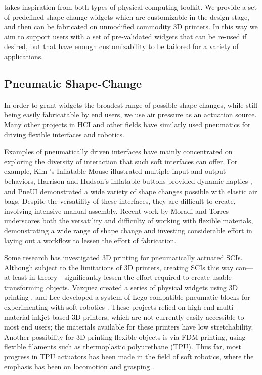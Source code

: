       \mp takes inspiration from both types of physical computing toolkit. We
      provide a set of predefined shape-change widgets which are customizable in
      the design stage, and then can be fabricated on unmodified commodity 3D
      printers. In this way we aim to support users with a set of pre-validated
      widgets that can be re-used if desired, but that have enough
      customizability to be tailored for a variety of applications.
        
    \subsection{Pneumatic Shape-Change}
      In order to grant \mp widgets the broadest range of possible shape
      changes, while still being easily fabricatable by end users, we use air
      pressure as an actuation source. Many other projects in HCI and other
      fields have similarly used pneumatics for driving flexible interfaces and
      robotics.

      Examples of pneumatically driven interfaces have mainly concentrated on
      exploring the diversity of interaction that such soft interfaces can
      offer. For example, Kim \etal's Inflatable Mouse \cite{Kim:2008}
      illustrated multiple input and output behaviors, Harrison and Hudson's
      inflatable buttons provided dynamic haptics \cite{Harrison:2009}, and
      PneUI \cite{Yao:2013} demonstrated a wide variety of shape changes
      possible with elastic air bags. Despite the versatility of these
      interfaces, they are difficult to create, involving intensive manual
      assembly. Recent work by Moradi and Torres \cite{Moradi:2020} underscores
      both the versatility and difficulty of working with flexible materials,
      demonstrating a wide range of shape change and investing considerable
      effort in laying out a workflow to lessen the effort of fabrication.

      Some research has investigated 3D printing for pneumatically actuated
      SCIs. Although subject to the limitations of 3D printers, creating SCIs
      this way can---at least in theory---significantly lessen the effort
      required to create usable transforming objects. Vazquez \etal created a
      series of physical widgets using 3D printing \cite{Vazquez:2015}, and
      Lee \etal developed a system of Lego-compatible pneumatic blocks for
      experimenting with soft robotics \cite{Lee:2018}. These projects relied on
      high-end multi-material inkjet-based 3D printers, which are not currently
      easily accessible to most end users; the materials available for these
      printers have low stretchability. Another possibility for 3D printing
      flexible objects is via FDM printing, using flexible filaments such as
      thermoplastic polyurethane (TPU). Thus far, most progress in TPU actuators
      has been made in the field of soft robotics, where the emphasis has been
      on locomotion and grasping \cite{Yap:2016}.
      
